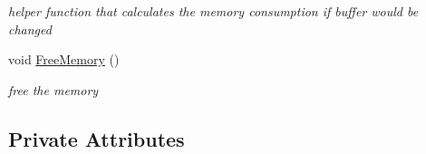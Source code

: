 \begin{DoxyCompactItemize}
\begin{DoxyCompactList}\small\item\em helper function that calculates the memory consumption if buffer would be changed \end{DoxyCompactList}\item 
\mbox{\label{classMorseDecode_a25c9323b16fe14681b05a8ff78bc3a21}} 
void \hyperlink{classMorseDecode_a25c9323b16fe14681b05a8ff78bc3a21}{Free\+Memory} ()
\begin{DoxyCompactList}\small\item\em free the memory \end{DoxyCompactList}\end{DoxyCompactItemize}
\subsection*{Private Attributes}
